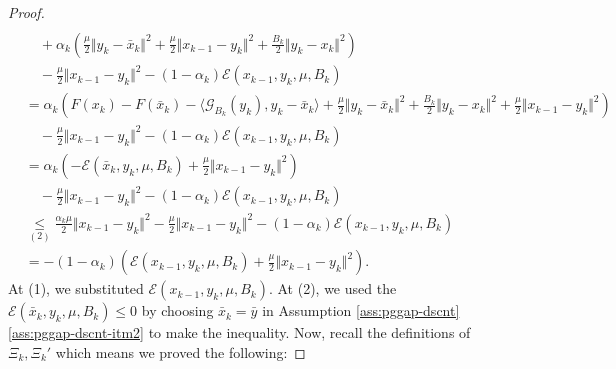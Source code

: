 \documentclass[12pt]{article}
\begin{document}
\begin{proof}
{\begin{align*}
                    \\&\quad 
                    + \alpha_k\left(
                        \frac{\mu}{2}\Vert y_k - \bar x_k\Vert^2
                        + \frac{\mu}{2}\Vert x_{k - 1} - y_k\Vert^2
                        + \frac{B_k}{2} \Vert y_k - x_k\Vert^2
                    \right)
                    \\ &\quad 
                    - \frac{\mu}{2}\Vert x_{k - 1} - y_k\Vert^2
                    - (1 - \alpha_k)\mathcal E(x_{k - 1}, y_k, \mu, B_k)
                \\
                &= \alpha_k\left(
                    F(x_k) - F(\bar x_k) 
                    - \langle \mathcal G_{B_k}(y_k), y_k - \bar x_k\rangle
                    + \frac{\mu}{2}\Vert y_k - \bar x_k\Vert^2
                    + \frac{B_k}{2} \Vert y_k - x_k\Vert^2
                    + \frac{\mu}{2}\Vert x_{k - 1} - y_k\Vert^2
                \right)
                    \\ &\quad 
                    - \frac{\mu}{2}\Vert x_{k - 1} - y_k\Vert^2
                    - (1 - \alpha_k)\mathcal E(x_{k - 1}, y_k, \mu, B_k)
                \\
                &=
                \alpha_k\left(
                    - \mathcal E(\bar x_k, y_k, \mu, B_k)
                    + \frac{\mu}{2}\Vert x_{k - 1} - y_k\Vert^2
                \right)
                    \\ &\quad 
                    - \frac{\mu}{2}\Vert x_{k - 1} - y_k\Vert^2
                    - (1 - \alpha_k)\mathcal E(x_{k - 1}, y_k, \mu, B_k)
                \\
                &\underset{(2)}{\le} 
                \frac{\alpha_k \mu}{2}\Vert x_{k - 1} - y_k\Vert^2
                - \frac{\mu}{2}\Vert x_{k - 1} - y_k\Vert^2
                - (1 - \alpha_k)\mathcal E(x_{k - 1}, y_k, \mu, B_k)
                \\
                &= -(1 - \alpha_k)\left(
                    \mathcal E(x_{k - 1}, y_k, \mu, B_k)
                    + \frac{\mu}{2}\Vert x_{k - 1} - y_k\Vert^2
                \right). 
            \end{align*}
            }
            At (1), we substituted $\mathcal E(x_{k - 1}, y_k, \mu, B_k)$. 
            At (2), we used the $\mathcal E(\bar x_k, y_k, \mu, B_k)\le 0$ by choosing $\bar x_k = \bar y$ in Assumption \ref{ass:pggap-dscnt}\ref{ass:pggap-dscnt-itm2}  to make the inequality. 
            Now, recall the definitions of $\Xi_k, \Xi_k'$ which means we proved the following: 

\end{proof}
\end{document}
